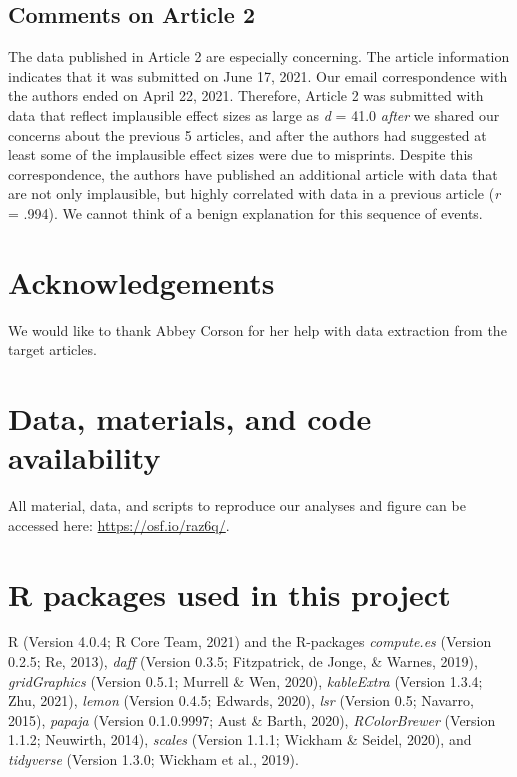 \documentclass[
  english,
  man, donotrepeattitle,floatsintext]{apa7}
\begin{document}
\hypertarget{comments-on-article-2}{%
\subsection{Comments on Article 2}\label{comments-on-article-2}}

The data published in Article 2 are especially concerning. The article information indicates that it was submitted on June 17, 2021. Our email correspondence with the authors ended on April 22, 2021. Therefore, Article 2 was submitted with data that reflect implausible effect sizes as large as \emph{d} = 41.0 \emph{after} we shared our concerns about the previous 5 articles, and after the authors had suggested at least some of the implausible effect sizes were due to misprints. Despite this correspondence, the authors have published an additional article with data that are not only implausible, but highly correlated with data in a previous article (\emph{r} = .994). We cannot think of a benign explanation for this sequence of events.

\hypertarget{acknowledgements}{%
\section{Acknowledgements}\label{acknowledgements}}

We would like to thank Abbey Corson for her help with data extraction from the target articles.

\hypertarget{data-materials-and-code-availability}{%
\section{Data, materials, and code availability}\label{data-materials-and-code-availability}}

\label{sec:sharing} All material, data, and scripts to reproduce our analyses and figure can be accessed here: \url{https://osf.io/raz6q/}.

\hypertarget{r-packages-used-in-this-project}{%
\section{R packages used in this project}\label{r-packages-used-in-this-project}}

R (Version 4.0.4; R Core Team, 2021) and the R-packages \emph{compute.es} (Version 0.2.5; Re, 2013), \emph{daff} (Version 0.3.5; Fitzpatrick, de Jonge, \& Warnes, 2019), \emph{gridGraphics} (Version 0.5.1; Murrell \& Wen, 2020), \emph{kableExtra} (Version 1.3.4; Zhu, 2021), \emph{lemon} (Version 0.4.5; Edwards, 2020), \emph{lsr} (Version 0.5; Navarro, 2015), \emph{papaja} (Version 0.1.0.9997; Aust \& Barth, 2020), \emph{RColorBrewer} (Version 1.1.2; Neuwirth, 2014), \emph{scales} (Version 1.1.1; Wickham \& Seidel, 2020), and \emph{tidyverse} (Version 1.3.0; Wickham et al., 2019).
\end{document}
